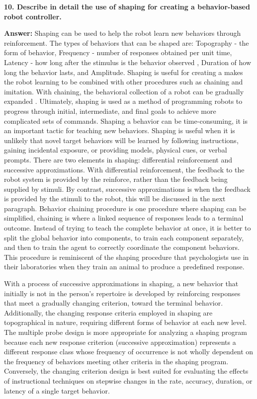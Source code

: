 \documentclass[a4paper, 10pt]{article}
\begin{document}
\hfill 

\textbf{10. Describe in detail the use of shaping for creating a behavior-based robot controller.}

\textbf{Answer:} Shaping can be used to help the robot learn new behaviors through reinforcement. The types of behaviors that can be shaped are: Topography - 	the form of behavior, Frequency - number of responses obtained per unit time, Latency - how long after the stimulus is the behavior observed , Duration of how long the behavior lasts, and Amplitude. Shaping is useful for creating a makes the robot learning to be combined with other procedures such as chaining and imitation. With chaining, the behavioral collection of a robot can be gradually expanded \cite{johnApplied}. Ultimately, shaping is used as a method of programming robots to progress through initial, intermediate, and final goals to achieve more complicated sets of commands. Shaping a behavior can be time-consuming, it is an important tactic for teaching new behaviors. Shaping is useful when it is unlikely that novel target behaviors will be learned by following instructions, gaining incidental exposure, or providing models, physical cues, or verbal prompts. There are two elements in shaping: differential reinforcement and successive approximations. With differential reinforcement, the feedback to the robot system is provided by the reinforce, rather than the feedback being supplied by stimuli. By contrast, successive approximations is when the feedback is provided by the stimuli to the robot, this will be discussed in the next paragraph. Behavior chaining procedure is one procedure where shaping can be simplified, chaining is where a linked sequence of responses leads to a terminal outcome. Instead of trying to teach the complete behavior at  once, it is better to split the global behavior into components, to train each component separately, and then to train the agent to correctly coordinate the component behaviors. This procedure is reminiscent of the shaping procedure that psychologists use in their laboratories when they train an animal to produce a predefined response.


With a process of successive approximations in shaping, a new behavior that initially is not in the person’s repertoire is developed by reinforcing responses that meet a gradually changing criterion, toward the terminal behavior. Additionally, the changing response
criteria employed in shaping are topographical in nature, requiring different forms of behavior at each new level. The multiple probe design is more appropriate for analyzing a shaping program because each new response criterion (successive approximation) represents a different response class whose frequency of occurrence is not wholly dependent on the frequency of behaviors meeting other criteria in the shaping program. Conversely, the changing criterion design is best suited for evaluating the effects of instructional techniques on stepwise changes in the rate, accuracy, duration, or latency of a single target behavior.
\end{document}
